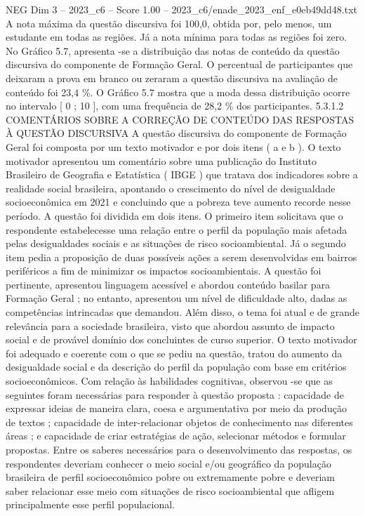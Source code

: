 \begin{textsample}{NEG Dim 3 – 2023\_c6 – Score 1.00 – 2023\_c6/enade\_2023\_enf\_e0eb49dd48.txt}
A nota máxima da questão discursiva foi 100,0, obtida por, pelo menos, um estudante em todas as regiões.
Já a nota mínima para todas as regiões foi zero.
No Gráfico 5.7, apresenta -se a distribuição das notas de conteúdo da questão discursiva do componente de Formação Geral.
O percentual de participantes que deixaram a prova em branco ou zeraram a questão discursiva na avaliação de conteúdo foi 23,4 \%.
O Gráfico 5.7 mostra que a moda dessa distribuição ocorre no intervalo [ 0 ; 10 ], com uma frequência de 28,2 \% dos participantes. 5.3.1.2 COMENTÁRIOS SOBRE A CORREÇÃO DE CONTEÚDO DAS RESPOSTAS À QUESTÃO DISCURSIVA A questão discursiva do componente de Formação Geral foi composta por um texto motivador e por dois itens ( a e b ).
O texto motivador apresentou um comentário sobre uma publicação do Instituto Brasileiro de Geografia e Estatística ( IBGE ) que tratava dos indicadores sobre a realidade social brasileira, apontando o crescimento do nível de desigualdade socioeconômica em 2021 e concluindo que a pobreza teve aumento recorde nesse período.
A questão foi dividida em dois itens.
O primeiro item solicitava que o respondente estabelecesse uma relação entre o perfil da população mais afetada pelas desigualdades sociais e as situações de risco socioambiental.
Já o segundo item pedia a proposição de duas possíveis ações a serem desenvolvidas em bairros periféricos a fim de minimizar os impactos socioambientais.
A questão foi pertinente, apresentou linguagem acessível e abordou conteúdo basilar para Formação Geral ; no entanto, apresentou um nível de dificuldade alto, dadas as competências intrincadas que demandou.
Além disso, o tema foi atual e de grande relevância para a sociedade brasileira, visto que abordou assunto de impacto social e de provável domínio dos concluintes de curso superior.
O texto motivador foi adequado e coerente com o que se pediu na questão, tratou do aumento da desigualdade social e da descrição do perfil da população com base em critérios socioeconômicos.
Com relação às habilidades cognitivas, observou -se que as seguintes foram necessárias para responder à questão proposta : capacidade de expressar ideias de maneira clara, coesa e argumentativa por meio da produção de textos ; capacidade de inter-relacionar objetos de conhecimento nas diferentes áreas ; e capacidade de criar estratégias de ação, selecionar métodos e formular propostas.
Entre os saberes necessários para o desenvolvimento das respostas, os respondentes deveriam conhecer o meio social e/ou geográfico da população brasileira de perfil socioeconômico pobre ou extremamente pobre e deveriam saber relacionar esse meio com situações de risco socioambiental que afligem principalmente esse perfil populacional.

\end{textsample}
